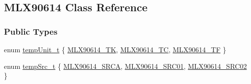 \hypertarget{class_m_l_x90614}{}\subsection{M\+L\+X90614 Class Reference}
\label{class_m_l_x90614}
\subsubsection*{Public Types}
\begin{DoxyCompactItemize}
\item 
enum \mbox{\hyperlink{class_m_l_x90614_a18769519e647d93c959566b81d2e514f}{temp\+Unit\+\_\+t}} \{ \mbox{\hyperlink{class_m_l_x90614_a18769519e647d93c959566b81d2e514fa074167c1192349236b451ecd3d7e5582}{M\+L\+X90614\+\_\+\+TK}}, 
\mbox{\hyperlink{class_m_l_x90614_a18769519e647d93c959566b81d2e514fa75d66a29cab65ff4514b5cd6a268c7bf}{M\+L\+X90614\+\_\+\+TC}}, 
\mbox{\hyperlink{class_m_l_x90614_a18769519e647d93c959566b81d2e514fa34f399de3c986d3eede0268f6a34a96b}{M\+L\+X90614\+\_\+\+TF}}
 \}
\item 
enum \mbox{\hyperlink{class_m_l_x90614_a500f8c49b00e725d5c201092d9c02b8b}{temp\+Src\+\_\+t}} \{ \mbox{\hyperlink{class_m_l_x90614_a500f8c49b00e725d5c201092d9c02b8ba8e4a1c077fba74d29d5c7065ed9cc382}{M\+L\+X90614\+\_\+\+S\+R\+CA}}, 
\mbox{\hyperlink{class_m_l_x90614_a500f8c49b00e725d5c201092d9c02b8ba91f620721ea47dec379db791d735a55b}{M\+L\+X90614\+\_\+\+S\+R\+C01}}, 
\mbox{\hyperlink{class_m_l_x90614_a500f8c49b00e725d5c201092d9c02b8baa8763ed94d24c7d2a45fcec6d7183643}{M\+L\+X90614\+\_\+\+S\+R\+C02}}
 \}
\end{DoxyCompactItemize}
